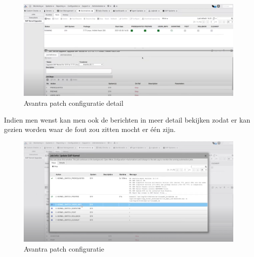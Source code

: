 \begin{figure}[htbp]
    \centering
    \includegraphics[width=\textwidth]{avantra2.png}
    \caption{Avantra patch configuratie detail}
     \label{fig:avantra2}
\end{figure}

Indien men wenst kan men ook de berichten in meer detail bekijken zodat er kan gezien worden waar de fout zou zitten mocht er één zijn.

\begin{figure}[htbp]
    \centering
    \includegraphics[width=\textwidth]{avantra3.png}
    \caption{Avantra patch configuratie}
     \label{fig:avantra3}
\end{figure}


